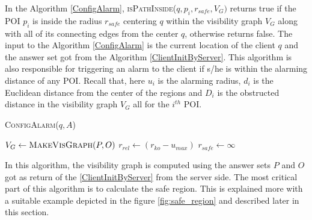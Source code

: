 \documentclass{sig-alternate}
\begin{document}
In the Algorithm \ref{ConfigAlarm}, \textsc{isPathInside}($q, p_i, r_{safe}, V_G)$ returns true if the POI $p_i$ is inside the radius $r_{safe}$ centering $q$ within the visibility graph $V_G$ along with all of its connecting edges from the center $q$, otherwise returns false.
The input to the Algorithm \ref{ConfigAlarm} is the current location of the client $q$ and the answer set got from the Algorithm \ref{ClientInitByServer}. This algorithm is also responsible for triggering an alarm to the client if s/he is within the alarming distance of any POI. Recall that, here $u_i$ is the alarming radius, $d_i$ is the Euclidean distance from the center of the regions and $D_i$ is the obstructed distance in the visibility graph $V_G$ all for the $i^{th}$ POI.
\begin{algorithm}
\caption{\textsc{ConfigAlarm}($q, A$)}
\label{ConfigAlarm}

    
     $V_G \gets \textsc{MakeVisGraph}(P, O)$ \;
     $r_{rel} \gets (r_{ko} - u_{max})$ \;
     $r_{safe} \gets \infty$ \;
    
    

\end{algorithm}

In this algorithm, the visibility graph is computed using the answer sets $P$ and $O$ got as return of the \ref{ClientInitByServer} from the server side. The most critical part of this algorithm is to calculate the safe region. This is explained more with a suitable example depicted in the figure \ref{fig:safe_region} and described later in this section.
\end{document}
